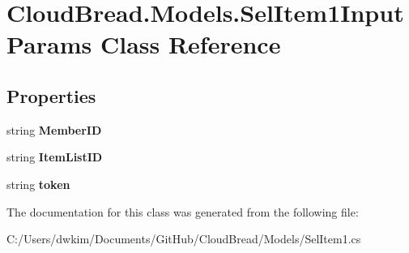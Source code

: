 \hypertarget{a00090}{}\section{Cloud\+Bread.\+Models.\+Sel\+Item1\+Input\+Params Class Reference}
\label{a00090}
\subsection*{Properties}
\begin{DoxyCompactItemize}
\item 
string {\bfseries Member\+ID}\hypertarget{a00090_a9f322637ea972987295a80bcddce0fc3}{}\label{a00090_a9f322637ea972987295a80bcddce0fc3}

\item 
string {\bfseries Item\+List\+ID}\hypertarget{a00090_a1a838a13ca91ebd401077830529ed3f5}{}\label{a00090_a1a838a13ca91ebd401077830529ed3f5}

\item 
string {\bfseries token}\hypertarget{a00090_a923b7449e62ea25988c149c16546376c}{}\label{a00090_a923b7449e62ea25988c149c16546376c}

\end{DoxyCompactItemize}


The documentation for this class was generated from the following file\+:\begin{DoxyCompactItemize}
\item 
C\+:/\+Users/dwkim/\+Documents/\+Git\+Hub/\+Cloud\+Bread/\+Models/Sel\+Item1.\+cs\end{DoxyCompactItemize}

